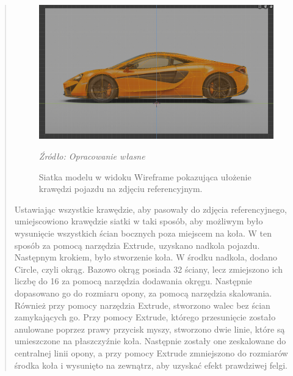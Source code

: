 \begin{quotation}
\begin{figure}[!hbt]
\centering
  \includegraphics[width=1\linewidth]{ksztalt.png}
  \caption{Siatka modelu w widoku Wireframe pokazująca ułożenie krawędzi pojazdu na zdjęciu referencyjnym.}\label{rys_10}
  \begin{minipage}[t]{0.75\linewidth}
    \emph{Źródło: Opracowanie własne}
  \end{minipage}
\end{figure}

\newpage
\indent Ustawiając wszystkie krawędzie, aby pasowały do zdjęcia referencyjnego, umiejscowiono krawędzie siatki w taki sposób, aby możliwym było wysunięcie wszystkich ścian bocznych poza miejscem na koła. W ten sposób za pomocą narzędzia Extrude, uzyskano nadkola pojazdu. Następnym krokiem, było stworzenie koła. W środku nadkola, dodano Circle, czyli okrąg. Bazowo okrąg posiada 32 ściany, lecz zmiejszono ich liczbę do 16 za pomocą narzędzia dodawania okręgu. Następnie dopasowano go do rozmiaru opony, za pomocą narzędzia skalowania. Również przy pomocy narzędzia Extrude, stworzono walec bez ścian zamykających go. Przy pomocy Extrude, którego przesunięcie zostało anulowane poprzez prawy przycisk myszy, stworzono dwie linie, które są umieszczone na płaszczyźnie koła. Następnie zostały one zeskalowane do centralnej linii opony, a przy pomocy Extrude zmniejszono do rozmiarów środka koła i wysunięto na zewnątrz, aby uzyskać efekt prawdziwej felgi. 


\end{quotation}
